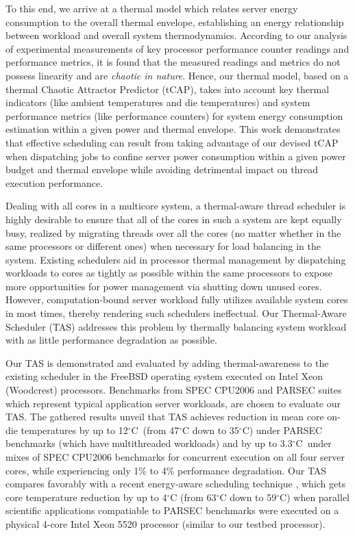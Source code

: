 \documentclass[times, 10pt,twocolumn]{IEEEtran}
\begin{document}
To this end, we arrive at a thermal model which relates server energy
consumption to the overall thermal envelope, establishing an energy
relationship between workload and overall system thermodynamics.
According to our analysis of experimental measurements of key processor
performance counter readings and performance metrics, it is found that
the measured readings and metrics do not possess linearity and are
\textit{chaotic in nature}.  Hence, our thermal model, based on a
thermal Chaotic Attractor Predictor (tCAP), takes into account key
thermal indicators (like ambient temperatures and die temperatures) and
system performance metrics (like performance counters) for system energy
consumption estimation within a given power and thermal envelope.  This
work demonstrates that effective scheduling can result from taking
advantage of our devised tCAP when dispatching jobs to confine server
power consumption within a given power budget and thermal envelope while
avoiding detrimental impact on thread execution performance.

Dealing with all cores in a multicore system, a thermal-aware thread
scheduler is highly desirable to ensure that all of the cores in such a
system are kept equally busy, realized by migrating threads over all the
cores (no matter whether in the same processors or different ones) when
necessary for load balancing in the system.  Existing schedulers aid in
processor thermal management by dispatching workloads to cores as
tightly as possible within the same processors to expose more
opportunities for power management via shutting down unused cores.
However, computation-bound server workload fully utilizes available
system cores in most times, thereby rendering such schedulers
ineffectual.  Our Thermal-Aware Scheduler (TAS) addresses this problem
by thermally balancing system workload with as little performance
degradation as possible.  

Our TAS is demonstrated and evaluated by adding thermal-awareness to the
existing scheduler in the FreeBSD operating system executed on Intel
Xeon (Woodcrest) processors.  Benchmarks from SPEC CPU2006 and PARSEC
suites which represent typical application server workloads, are chosen
to evaluate our TAS.  The gathered results unveil that TAS achieves
reduction in mean core on-die temperatures by up to 12$^{\circ}$C\ 
(from 47$^\circ$C down to 35$^\circ$C) under
PARSEC benchmarks (which have multithreaded workloads) and by up to
3.3$^{\circ}$C\ under mixes of SPEC CPU2006 benchmarks for concurrent
execution on all four server cores, while experiencing only 1\% to 4\%
performance degradation.  Our TAS compares favorably with a recent
energy-aware scheduling technique \cite{Sarood2011}, 
which gets core temperature reduction
by up to 4$^\circ$C (from 63$^\circ$C down to 59$^\circ$C) when parallel
scientific applications compatiable to PARSEC benchmarks 
were executed on a physical
4-core Intel Xeon 5520 processor (similar to our testbed processor).
\end{document}
